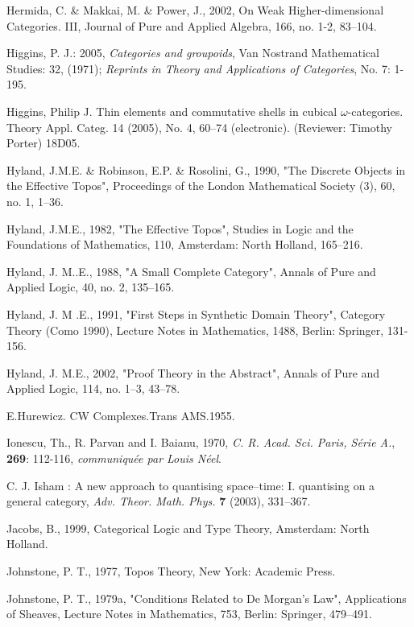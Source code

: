 \documentclass[12pt]{article}
\theoremstyle{plain}
\theoremstyle{definition}
\numberwithin{equation}{section}
\begin{document}
\begin{thebibliography}{99}
Hermida, C. \& Makkai, M. \& Power, J., 2002, On Weak Higher-dimensional Categories. III, Journal of Pure and Applied Algebra, 166, no. 1-2, 83--104.  

Higgins, P. J.: 2005, \emph{Categories and groupoids}, Van
Nostrand Mathematical Studies: 32, (1971); \emph{Reprints in
Theory and Applications of Categories}, No. 7: 1-195.

Higgins, Philip J. Thin elements and commutative shells in cubical
$\omega$-categories. Theory Appl. Categ. 14 (2005), No. 4, 60--74
(electronic). (Reviewer: Timothy Porter) 18D05.

Hyland,  J.M.E. \& Robinson,  E.P. \& Rosolini, G., 1990, "The Discrete Objects in the Effective Topos", Proceedings of the London Mathematical Society (3), 60, no. 1, 1--36. 

Hyland,  J.M.E., 1982, "The Effective Topos", Studies in Logic and the Foundations of Mathematics, 110, Amsterdam: North Holland, 165--216.  

Hyland, J. M..E., 1988, "A Small Complete Category", Annals of Pure and Applied Logic, 40, no. 2, 135--165. 

Hyland,  J. M .E., 1991, "First Steps in Synthetic Domain Theory", Category Theory (Como 1990), Lecture Notes in Mathematics, 1488, Berlin: Springer, 131-156.  

Hyland, J. M.E., 2002, "Proof Theory in the Abstract", Annals of Pure and Applied Logic, 114, no. 1--3, 43--78. 

E.Hurewicz. CW Complexes.Trans AMS.1955.

Ionescu, Th., R. Parvan and I. Baianu, 1970, {\em C. R. Acad. Sci. Paris, S\'erie A.}, \textbf{269}:
112-116, {\em communiqu\'ee par Louis N\'eel}.  

C. J. Isham : A new approach to quantising space--time: I.
quantising on a general category, \emph{Adv. Theor. Math. Phys.}
\textbf{7} (2003), 331--367.

Jacobs, B., 1999, Categorical Logic and Type Theory, Amsterdam: North Holland.  

Johnstone, P. T., 1977, Topos Theory, New York: Academic Press. 

Johnstone, P. T., 1979a, "Conditions Related to De Morgan's Law", Applications of Sheaves, Lecture Notes in Mathematics, 753, Berlin: Springer, 479--491. 


\end{thebibliography}
\end{document}
